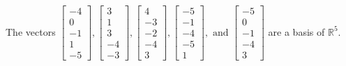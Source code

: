 \begin{exercise}
\begin{exerciseStatement}
  \end{exerciseStatement}
  \begin{exerciseAnswer}
   The vectors \(\left[\begin{array}{r}
-4 \\
0 \\
-1 \\
1 \\
-5
\end{array}\right] , \left[\begin{array}{r}
3 \\
1 \\
3 \\
-4 \\
-3
\end{array}\right] , \left[\begin{array}{r}
4 \\
-3 \\
-2 \\
-4 \\
3
\end{array}\right] , \left[\begin{array}{r}
-5 \\
-1 \\
-4 \\
-5 \\
1
\end{array}\right] , \text{ and } \left[\begin{array}{r}
-5 \\
0 \\
-1 \\
-4 \\
3
\end{array}\right]\) 
  	 are  a basis of \(\mathbb{R}^5\).
  


  \end{exerciseAnswer}
\end{exercise}